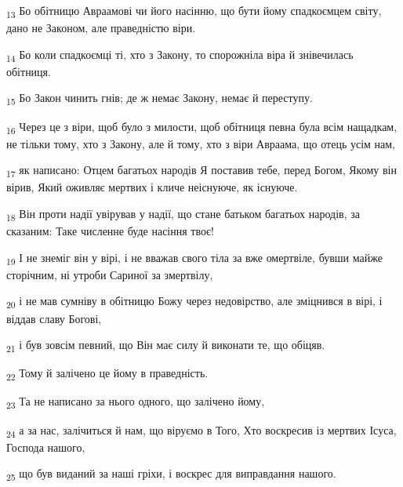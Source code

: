 \begin{tcolorbox}
\textsubscript{13} Бо обітницю Авраамові чи його насінню, що бути йому спадкоємцем світу, дано не Законом, але праведністю віри.
\end{tcolorbox}
\begin{tcolorbox}
\textsubscript{14} Бо коли спадкоємці ті, хто з Закону, то спорожніла віра й знівечилась обітниця.
\end{tcolorbox}
\begin{tcolorbox}
\textsubscript{15} Бо Закон чинить гнів; де ж немає Закону, немає й переступу.
\end{tcolorbox}
\begin{tcolorbox}
\textsubscript{16} Через це з віри, щоб було з милости, щоб обітниця певна була всім нащадкам, не тільки тому, хто з Закону, але й тому, хто з віри Авраама, що отець усім нам,
\end{tcolorbox}
\begin{tcolorbox}
\textsubscript{17} як написано: Отцем багатьох народів Я поставив тебе, перед Богом, Якому він вірив, Який оживляє мертвих і кличе неіснуюче, як існуюче.
\end{tcolorbox}
\begin{tcolorbox}
\textsubscript{18} Він проти надії увірував у надії, що стане батьком багатьох народів, за сказаним: Таке численне буде насіння твоє!
\end{tcolorbox}
\begin{tcolorbox}
\textsubscript{19} І не знеміг він у вірі, і не вважав свого тіла за вже омертвіле, бувши майже сторічним, ні утроби Сариної за змертвілу,
\end{tcolorbox}
\begin{tcolorbox}
\textsubscript{20} і не мав сумніву в обітницю Божу через недовірство, але зміцнився в вірі, і віддав славу Богові,
\end{tcolorbox}
\begin{tcolorbox}
\textsubscript{21} і був зовсім певний, що Він має силу й виконати те, що обіцяв.
\end{tcolorbox}
\begin{tcolorbox}
\textsubscript{22} Тому й залічено це йому в праведність.
\end{tcolorbox}
\begin{tcolorbox}
\textsubscript{23} Та не написано за нього одного, що залічено йому,
\end{tcolorbox}
\begin{tcolorbox}
\textsubscript{24} а за нас, залічиться й нам, що віруємо в Того, Хто воскресив із мертвих Ісуса, Господа нашого,
\end{tcolorbox}
\begin{tcolorbox}
\textsubscript{25} що був виданий за наші гріхи, і воскрес для виправдання нашого.
\end{tcolorbox}
